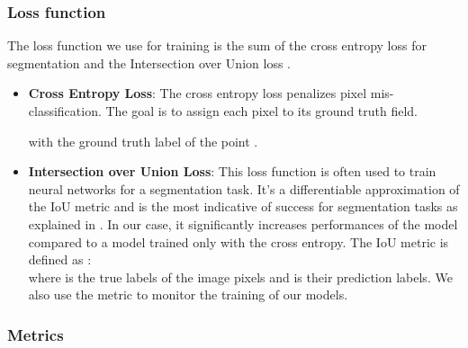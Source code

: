 \documentclass[runningheads]{llncs}
\begin{document}
\subsubsection{Loss function}\hfill

The loss function we use for training is the sum of the cross entropy loss for segmentation  and the Intersection over Union loss .




\begin{itemize}
\item \textbf{Cross Entropy Loss}: The cross entropy loss penalizes pixel mis-classification. The goal is to assign each pixel to  its ground truth field.


with  the ground truth label of the point .\\

\item \textbf{Intersection over Union Loss}: This loss function is often used to train neural networks for a segmentation task. It's a differentiable approximation of the IoU metric and is the most indicative of success for segmentation tasks as explained in \cite{IoU}. In our case, it significantly increases performances of the model compared to a model trained only with the cross entropy. The IoU metric is defined as : \\


where  is the true labels of the image pixels and  is their prediction labels. We also use the  metric \iffalse in the callback \fi to monitor the training of our models.
\end{itemize}

\subsubsection{Metrics}\hfill
\end{document}
